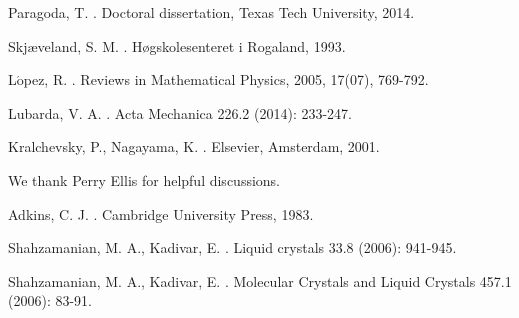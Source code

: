 \documentclass[nottitlepage]{article}
\begin{document}
\begin{thebibliography}{99}
Paragoda, T.
.
\newblock  Doctoral dissertation, Texas Tech University, 2014.

Skj\ae veland, S. M.
.
\newblock  H\o gskolesenteret i Rogaland, 1993.

L$\mathrm{\acute{o}}$pez, R.
.
\newblock  Reviews in Mathematical Physics, 2005, 17(07), 769-792.

Lubarda, V. A.
.
\newblock  Acta Mechanica 226.2 (2014): 233-247.

Kralchevsky, P., Nagayama, K.
.
\newblock Elsevier, Amsterdam, 2001.


We thank Perry Ellis for helpful discussions.

Adkins, C. J.
.
\newblock Cambridge University Press, 1983.

Shahzamanian, M. A., Kadivar, E.
.
\newblock Liquid crystals 33.8 (2006): 941-945.


Shahzamanian, M. A., Kadivar, E.
.
\newblock Molecular Crystals and Liquid Crystals 457.1 (2006): 83-91.
\end{thebibliography}
\end{document}
